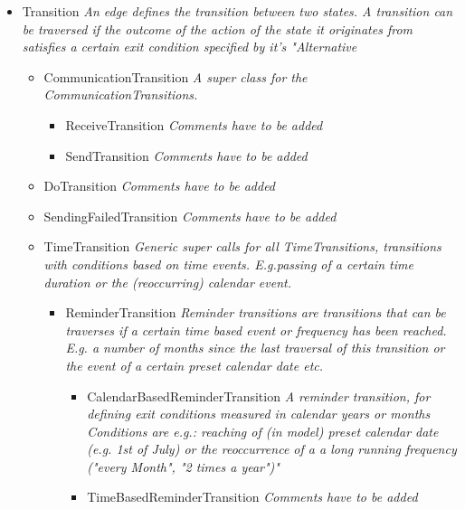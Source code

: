 \begin{itemize}
\begin{itemize}
\begin{itemize}
\begin{itemize}
		\end{itemize}
		\item Transition \linebreak \textit{An edge defines the transition between two states. A transition can be traversed if the outcome of the action of the state it originates from satisfies a certain exit condition specified by it's "Alternative}
		\begin{itemize}
			\item CommunicationTransition \linebreak \textit{A super class for the CommunicationTransitions.}
			\begin{itemize}
				\item ReceiveTransition \linebreak \textit{Comments have to be added}
				\item SendTransition \linebreak \textit{Comments have to be added}
			\end{itemize}
			\item DoTransition \linebreak \textit{Comments have to be added}
			\item SendingFailedTransition \linebreak \textit{Comments have to be added}
			\item TimeTransition \linebreak \textit{Generic super calls for all TimeTransitions, transitions with conditions based on time events. E.g.passing of a certain time duration or the (reoccurring) calendar event. }
			\begin{itemize}
				\item ReminderTransition \linebreak \textit{Reminder transitions are transitions that can be traverses if a certain time based event or frequency has been reached. E.g. a number of months since the last traversal of this transition or the event of a certain preset calendar date etc.}
				\begin{itemize}
					\item CalendarBasedReminderTransition \linebreak \textit{A reminder transition, for defining exit conditions measured in calendar years or months \\ Conditions are e.g.: reaching of (in model) preset calendar date (e.g. 1st of July) or the reoccurrence of a a long running frequency ("every Month", "2 times a year")"}
					\item TimeBasedReminderTransition \linebreak \textit{Comments have to be added}

\end{itemize}
\end{itemize}
\end{itemize}
\end{itemize}
\end{itemize}
\end{itemize}
